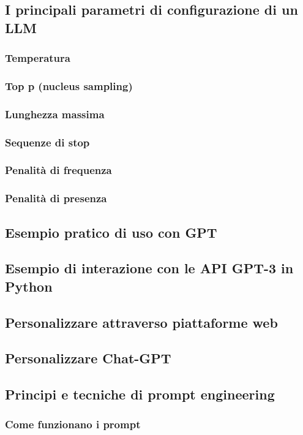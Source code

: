     \subsection{I principali parametri di configurazione di un LLM}
        \subsubsection{Temperatura}
        \subsubsection{Top p (nucleus sampling)}
        \subsubsection{Lunghezza massima}
        \subsubsection{Sequenze di stop}
        \subsubsection{Penalità di frequenza}
        \subsubsection{Penalità di presenza}
    \subsection{Esempio pratico di uso con GPT}
    \subsection{Esempio di interazione con le API GPT-3 in Python}
    \subsection{Personalizzare attraverso piattaforme web}
    \subsection{Personalizzare Chat-GPT}
    \subsection{Principi e tecniche di prompt engineering}
        \subsubsection{Come funzionano i prompt}

